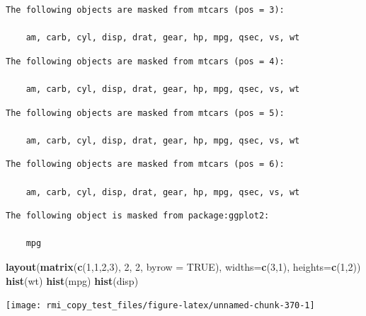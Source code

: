 \documentclass[]{book}
\newenvironment{Shaded}{\begin{snugshade}}{\end{snugshade}}
\newcommand{\KeywordTok}[1]{\textcolor[rgb]{0.13,0.29,0.53}{\textbf{#1}}}
\newcommand{\DataTypeTok}[1]{\textcolor[rgb]{0.13,0.29,0.53}{#1}}
\newcommand{\DecValTok}[1]{\textcolor[rgb]{0.00,0.00,0.81}{#1}}
\newcommand{\OtherTok}[1]{\textcolor[rgb]{0.56,0.35,0.01}{#1}}
\newcommand{\NormalTok}[1]{#1}
\theoremstyle{definition}
\theoremstyle{definition}
\theoremstyle{definition}
\theoremstyle{remark}
\begin{document}
\begin{verbatim}
The following objects are masked from mtcars (pos = 3):

    am, carb, cyl, disp, drat, gear, hp, mpg, qsec, vs, wt
\end{verbatim}

\begin{verbatim}
The following objects are masked from mtcars (pos = 4):

    am, carb, cyl, disp, drat, gear, hp, mpg, qsec, vs, wt
\end{verbatim}

\begin{verbatim}
The following objects are masked from mtcars (pos = 5):

    am, carb, cyl, disp, drat, gear, hp, mpg, qsec, vs, wt
\end{verbatim}

\begin{verbatim}
The following objects are masked from mtcars (pos = 6):

    am, carb, cyl, disp, drat, gear, hp, mpg, qsec, vs, wt
\end{verbatim}

\begin{verbatim}
The following object is masked from package:ggplot2:

    mpg
\end{verbatim}

\begin{Shaded}
\begin{Highlighting}[]
\KeywordTok{layout}\NormalTok{(}\KeywordTok{matrix}\NormalTok{(}\KeywordTok{c}\NormalTok{(}\DecValTok{1}\NormalTok{,}\DecValTok{1}\NormalTok{,}\DecValTok{2}\NormalTok{,}\DecValTok{3}\NormalTok{), }\DecValTok{2}\NormalTok{, }\DecValTok{2}\NormalTok{, }\DataTypeTok{byrow =} \OtherTok{TRUE}\NormalTok{), }
    \DataTypeTok{widths=}\KeywordTok{c}\NormalTok{(}\DecValTok{3}\NormalTok{,}\DecValTok{1}\NormalTok{), }\DataTypeTok{heights=}\KeywordTok{c}\NormalTok{(}\DecValTok{1}\NormalTok{,}\DecValTok{2}\NormalTok{))}
\KeywordTok{hist}\NormalTok{(wt)}
\KeywordTok{hist}\NormalTok{(mpg)}
\KeywordTok{hist}\NormalTok{(disp)}
\end{Highlighting}
\end{Shaded}

\begin{center}\texttt{[image: rmi\_copy\_test\_files/figure-latex/unnamed-chunk-370-1]} \end{center}
\end{document}

